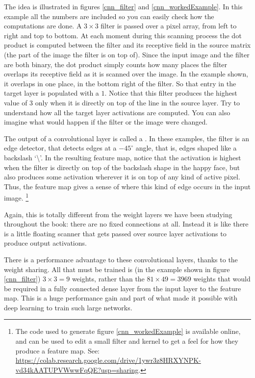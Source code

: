 The idea is illustrated in figures \ref{cnn_filter} and \ref{cnn_workedExample}. In this example all the numbers are included so you can easily check how the computations are done. A $3 \times 3$ filter is passed over a pixel array, from left to right and top to bottom. At each moment during this scanning process the dot product is computed between the filter and its receptive field in the source matrix (the part of the image the filter is on top of). Since the input image and the filter are both binary, the dot product simply counts how many places the filter overlaps its receptive field as it is scanned over the image. In the example shown, it overlaps in one place, in the bottom right of the filter. So that entry in the target layer is populated with a $1$. Notice that this filter produces the highest value of $3$ only when it is directly on top of the line in the source layer. Try to understand how all the target layer activations are computed. You can also imagine what would happen if the filter or the image were changed.

The output of a convolutional layer is called a . In these examples, the filter is an edge detector, that detects edges at a $-45^\circ$ angle, that is, edges shaped like a backslash `\textbackslash'. In the resulting feature map, notice that the activation is highest when the filter is directly on top of the backslash shape in the happy face, but also produces some activation wherever it is on top of any kind of active pixel. Thus, the feature map gives a sense of where this kind of edge occurs in the input image. \footnote{The code used to generate figure \ref{cnn_workedExample} is available online, and can be used to edit a small filter and kernel to get a feel for how they produce a feature map. See: \url{https://colab.research.google.com/drive/1ywr3z8HRXYNPK-vd34kAATUPVWwwFqQE?usp=sharing}.}

Again, this is totally different from the weight layers we have been studying throughout the book: there are no fixed connections at all. Instead it is like there is a little floating scanner that gets passed over source layer activations to produce output activations. 

There is a performance advantage to these convolutional layers, thanks to the weight sharing. All that must be trained is (in the example shown in figure \ref{cnn_filter}) $3 \times 3=9$ weights, rather than the $81 \times 49 = 3969$ weights that would be required in a fully connected dense layer from the input layer to the feature map. This is a huge performance gain and part of what  made it possible with deep learning to train such large networks.

